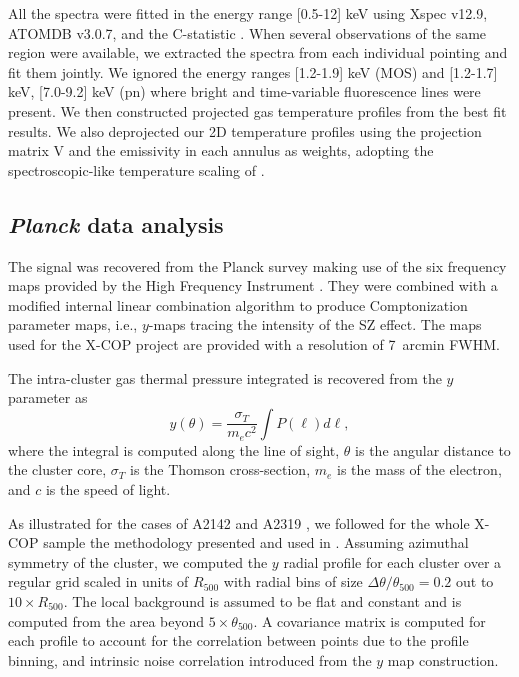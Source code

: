 \documentclass[traditabstract   ]{aa} %
\begin{document}
All the spectra were fitted in the energy range [0.5-12] keV using {\sc Xspec} v12.9, ATOMDB v3.0.7, and the C-statistic \citep{cash79}.  When several observations of the same region were available, we extracted the spectra from each individual pointing and fit them jointly. We ignored the energy ranges [1.2-1.9] keV (MOS) and [1.2-1.7] keV, [7.0-9.2] keV (pn) where bright and time-variable fluorescence lines were present. We then constructed projected gas temperature profiles from the best fit results. We also deprojected our 2D temperature profiles using the projection matrix V and the emissivity in each annulus as weights, adopting the spectroscopic-like temperature scaling of \cite{mazzotta+04}.

\subsection{\emph{Planck} data analysis}
\label{s:plck}

The signal was recovered from the Planck survey  \citep{tauber+10,planckdr2015} making use of the six frequency maps provided by the High Frequency Instrument \citep[HFI][]{lamarre+10,planckHFI}. They were combined with a modified internal linear combination algorithm    \citep[MILCA,][]{hurier+13}  to produce  Comptonization parameter maps, i.e., $y$-maps tracing the intensity of the SZ effect. The maps used for the X-COP project are provided with a resolution of 7~arcmin FWHM.

The intra-cluster gas thermal pressure integrated is recovered from the $y$ parameter \citep{SZ} as 
\begin{equation}
y(\theta)=\frac{\sigma_T}{m_ec^2}\int P(\ell)d\ell,
\end{equation}
where the integral is computed along the line of sight, $\theta$ is the angular distance to the cluster core, $\sigma_T$ is the Thomson cross-section, $m_e$ is the mass of the electron, and $c$ is the speed of light. 

As illustrated for the cases of A2142 \citep{tchernin16} and A2319 \citep{ghirardini18}, we followed for the whole X-COP sample the methodology presented and used in \citet{planck+13}. 
Assuming azimuthal symmetry of the cluster, we computed the $y$ radial profile for each cluster over a regular grid scaled in units of $R_{500}$ with radial bins of size $\Delta\theta/\theta_{500}=0.2$ out to $10\times R_{500}$. The local background is assumed to be flat and constant and is computed from the area beyond $5\times \theta_{500}$. A covariance matrix is computed for each profile to account for the correlation between points due to the profile binning, and intrinsic noise correlation introduced from the $y$ map construction.
\end{document}
